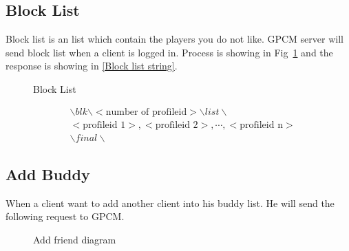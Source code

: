 \documentclass[oneside,titlepage,a4paper]{Definition/retrospy} %
\begin{document}
\subsection{Block List}
Block list is an list which contain the players you do not like.
GPCM server will send block list when a client is logged in. Process is showing in Fig~\ref{Block List} and the response is showing in \ref{Block list string}.
\begin{figure}[H]
	\centering
	\caption{Block List}
	\label{Block List}
\end{figure}

\begin{tcolorbox}\label{Block list string}
	\begin{equation}
	\begin{split}
	&\backslash blk \backslash < \text{number of profileid} > \backslash list \backslash \\ &<\text{profileid 1}>,<\text{profileid 2}>,\cdots,<\text{profileid n}>\\
	&\backslash final \backslash
	\end{split}
	\end{equation}
\end{tcolorbox}
\subsection{Add Buddy}
When a client want to add another client into his buddy list. He will send the following request to GPCM.

\begin{figure}[H]
	\centering
	\caption{Add friend diagram}
	\label{Add friend diagram}
\end{figure}
\end{document}
